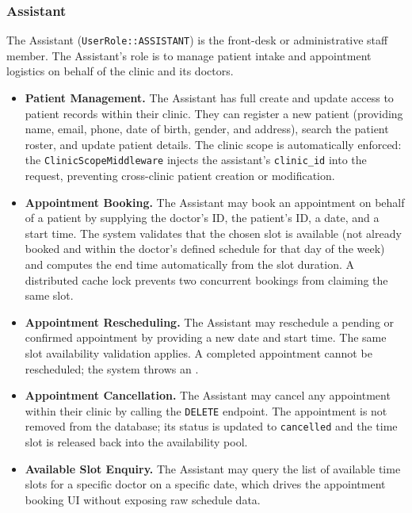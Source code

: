 \subsubsection{Assistant}

The Assistant (\texttt{UserRole::ASSISTANT}) is the front-desk or
administrative staff member. The Assistant's role is to manage patient
intake and appointment logistics on behalf of the clinic and its doctors.

\begin{itemize}
  \item \textbf{Patient Management.} The Assistant has full create and
    update access to patient records within their clinic. They can
    register a new patient (providing name, email, phone, date of birth,
    gender, and address), search the patient roster, and update patient
    details. The clinic scope is automatically enforced: the
    \texttt{ClinicScopeMiddleware} injects the assistant's
    \texttt{clinic\_id} into the request, preventing cross-clinic
    patient creation or modification.
  \item \textbf{Appointment Booking.} The Assistant may book an
    appointment on behalf of a patient by supplying the doctor's ID,
    the patient's ID, a date, and a start time. The system validates
    that the chosen slot is available (not already booked and within
    the doctor's defined schedule for that day of the week) and
    computes the end time automatically from the slot duration. A
    distributed cache lock prevents two concurrent bookings from
    claiming the same slot.
  \item \textbf{Appointment Rescheduling.} The Assistant may reschedule
    a pending or confirmed appointment by providing a new date and
    start time. The same slot availability validation applies. A
    completed appointment cannot be rescheduled; the system throws an
    .
  \item \textbf{Appointment Cancellation.} The Assistant may cancel
    any appointment within their clinic by calling the
    \texttt{DELETE} endpoint. The appointment is not removed from the
    database; its status is updated to \texttt{cancelled} and the
    time slot is released back into the availability pool.
  \item \textbf{Available Slot Enquiry.} The Assistant may query the
    list of available time slots for a specific doctor on a specific
    date, which drives the appointment booking UI without exposing raw
    schedule data.
\end{itemize}

